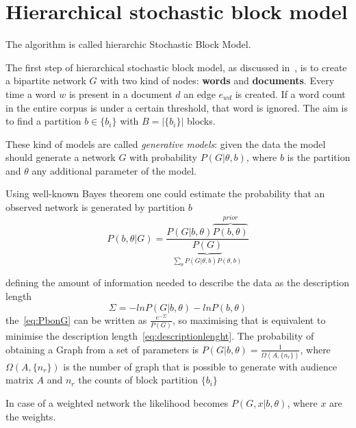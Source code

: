 \chapter{Hierarchical stochastic block model}\label{app:hsbm}
The algorithm is called hierarchic Stochastic Block Model.

The first step of hierarchical stochastic block model, as discussed in~\cite{peixoto2014efficient},
is to create a bipartite network $G$ with two kind of nodes: \textbf{words} and \textbf{documents}.
Every time a word $w$ is present in a document $d$ an edge $e_{wd}$ is created.
If a word count in the entire corpus is under a certain threshold, that word is ignored.
The aim is to find a partition $b\in\{b_i\}$ with $B=\left|\{b_i\}\right|$ blocks.

These kind of models are called \textit{generative models}: given the data the model
should generate a network $G$ with probability $P(G|\theta, b)$, where $b$ is
the partition and $\theta$ any additional parameter of the model.

Using well-known Bayes theorem one could estimate the probability that an
observed network is generated by partition $b$
\begin{equation}\label{eq:PbonG}
  P(b,\theta|G)=\frac{P(G|b,\theta)\overbrace{P(b,\theta)}^{prior}}{\underbrace{P(G)}_{\sum_{\theta}P(G|\theta, b)P(\theta, b)}}
\end{equation}

defining the amount of information needed to describe the data as the description length
\begin{equation}\label{eq:descriptionlenght}
  \Sigma=-lnP(G|b,\theta)-lnP(b, \theta)
\end{equation}
the~\ref{eq:PbonG} can be written as $\frac{e^{-\Sigma}}{P(G)}$, so maximising that is equivalent to minimise the description length~\ref{eq:descriptionlenght}. The probability of obtaining a Graph from a set of parameters is $P(G|b,\theta)=\frac{1}{\Omega(A,\{n_r\})}$, where $\Omega(A,\{n_r\})$ is the number of graph that is possible to generate with audience matrix $A$ and $n_r$ the counts of block partition $\{b_i\}$

In case of a weighted network the likelihood becomes $P(G,x|b,\theta)$, where $x$
are the weights.

